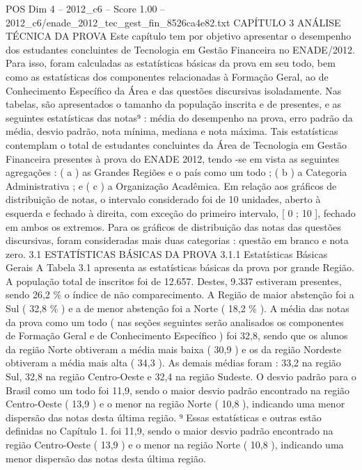 \begin{textsample}{POS Dim 4 – 2012\_c6 – Score 1.00 – 2012\_c6/enade\_2012\_tec\_gest\_fin\_8526ca4e82.txt}  \label{ex:f4_pos_127}
CAPÍTULO 3 ANÁLISE TÉCNICA DA PROVA Este capítulo tem por objetivo apresentar o desempenho dos estudantes concluintes de Tecnologia em Gestão Financeira no ENADE/2012.
Para isso, foram calculadas as estatísticas básicas da prova em seu todo, bem como as estatísticas dos componentes relacionadas à Formação Geral, ao de Conhecimento Específico da Área e das questões discursivas isoladamente.
Nas tabelas, são apresentados o tamanho da população inscrita e de presentes, e as seguintes estatísticas das notas⁹ : média do desempenho na prova, erro padrão da média, desvio padrão, nota mínima, mediana e nota máxima.
Tais estatísticas contemplam o total de estudantes concluintes da Área de Tecnologia em Gestão Financeira presentes à prova do ENADE 2012, tendo -se em vista as seguintes agregações : ( a ) as Grandes Regiões e o país como um todo ; ( b ) a Categoria Administrativa ; e ( c ) a Organização Acadêmica.
Em relação aos gráficos de distribuição de notas, o intervalo considerado foi de 10 unidades, aberto à esquerda e fechado à direita, com exceção do primeiro intervalo, [ 0 ; 10 ], fechado em ambos os extremos.
Para os gráficos de distribuição das notas das questões discursivas, foram consideradas mais duas categorias : questão em branco e nota zero. 3.1 ESTATÍSTICAS BÁSICAS DA PROVA 3.1.1 Estatísticas Básicas Gerais A Tabela 3.1 apresenta as estatísticas básicas da prova por grande Região.
A população total de inscritos foi de 12.657.
Destes, 9.337 estiveram presentes, sendo 26,2 \% o índice de não comparecimento.
A Região de maior abstenção foi a Sul ( 32,8 \% ) e a de menor abstenção foi a Norte ( 18,2 \% ).
A média das notas da prova como um todo ( nas seções seguintes serão analisados os componentes de Formação Geral e de Conhecimento Específico ) foi 32,8, sendo que os alunos da região Norte obtiveram a média mais baixa ( 30,9 ) e os da região Nordeste obtiveram a média mais alta ( 34,3 ).
As demais médias foram : 33,2 na região Sul, 32,8 na região Centro-Oeste e 32,4 na região Sudeste.
O desvio padrão para o Brasil como um todo foi 11,9, sendo o maior desvio padrão encontrado na região Centro-Oeste ( 13,9 ) e o menor na região Norte ( 10,8 ), indicando uma menor dispersão das notas desta última região. ⁹ Essas estatísticas e outras estão definidas no Capítulo 1. foi 11,9, sendo o maior desvio padrão encontrado na região Centro-Oeste ( 13,9 ) e o menor na região Norte ( 10,8 ), indicando uma menor dispersão das notas desta última região.

\end{textsample}
